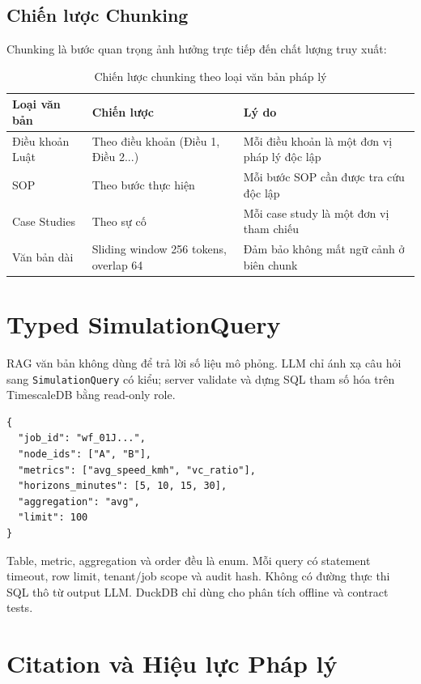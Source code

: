 \subsection{Chiến lược Chunking}

Chunking là bước quan trọng ảnh hưởng trực tiếp đến chất lượng truy xuất:

\begin{table}[H]
\centering
\caption{Chiến lược chunking theo loại văn bản pháp lý}
\label{tab:chunking}
\renewcommand{\arraystretch}{1.4}
\begin{tabular}{p{3cm} p{3cm} p{6cm}}
\toprule
\textbf{Loại văn bản} & \textbf{Chiến lược} & \textbf{Lý do} \\
\midrule
Điều khoản Luật & Theo điều khoản (Điều 1, Điều 2...) & Mỗi điều khoản là một đơn vị pháp lý độc lập \\
\rowcolor{rowgray}
SOP & Theo bước thực hiện & Mỗi bước SOP cần được tra cứu độc lập \\
Case Studies & Theo sự cố & Mỗi case study là một đơn vị tham chiếu \\
\rowcolor{rowgray}
Văn bản dài & Sliding window 256 tokens, overlap 64 & Đảm bảo không mất ngữ cảnh ở biên chunk \\
\bottomrule
\end{tabular}
\end{table}

\section{Typed SimulationQuery}

RAG văn bản không dùng để trả lời số liệu mô phỏng. LLM chỉ ánh xạ câu hỏi sang \texttt{SimulationQuery} có kiểu; server validate và dựng SQL tham số hóa trên TimescaleDB bằng read-only role.

\begin{lstlisting}[caption={SimulationQuery có kiểu},label={lst:simulation_query}]
{
  "job_id": "wf_01J...",
  "node_ids": ["A", "B"],
  "metrics": ["avg_speed_kmh", "vc_ratio"],
  "horizons_minutes": [5, 10, 15, 30],
  "aggregation": "avg",
  "limit": 100
}
\end{lstlisting}

Table, metric, aggregation và order đều là enum. Mỗi query có statement timeout, row limit, tenant/job scope và audit hash. Không có đường thực thi SQL thô từ output LLM. DuckDB chỉ dùng cho phân tích offline và contract tests.

\section{Citation và Hiệu lực Pháp lý}

